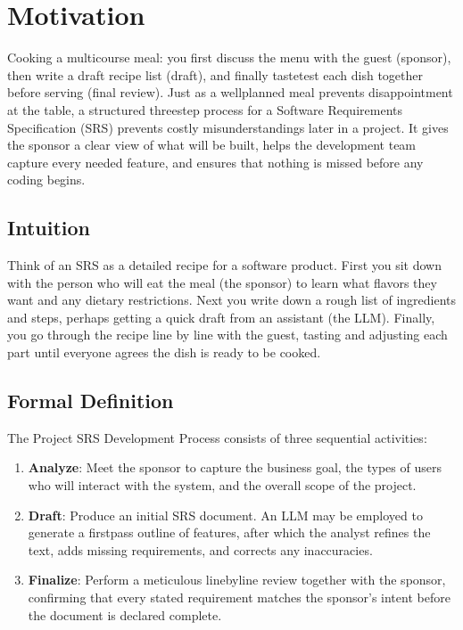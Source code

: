\documentclass[12pt, a4paper]{article}
\begin{document}
\section{Motivation}
Cooking a multicourse meal: you first discuss the menu with the guest (sponsor), then write a draft recipe list (draft), and finally tastetest each dish together before serving (final review). Just as a wellplanned meal prevents disappointment at the table, a structured threestep process for a Software Requirements Specification (SRS) prevents costly misunderstandings later in a project. It gives the sponsor a clear view of what will be built, helps the development team capture every needed feature, and ensures that nothing is missed before any coding begins.  

\subsection{Intuition}
Think of an SRS as a detailed recipe for a software product. First you sit down with the person who will eat the meal (the sponsor) to learn what flavors they want and any dietary restrictions. Next you write down a rough list of ingredients and steps, perhaps getting a quick draft from an assistant (the LLM). Finally, you go through the recipe line by line with the guest, tasting and adjusting each part until everyone agrees the dish is ready to be cooked.  

\subsection{Formal Definition}
The Project SRS Development Process consists of three sequential activities:

\begin{enumerate}
    \item \textbf{Analyze}: Meet the sponsor to capture the business goal, the types of users who will interact with the system, and the overall scope of the project.
    \item \textbf{Draft}: Produce an initial SRS document. An LLM may be employed to generate a firstpass outline of features, after which the analyst refines the text, adds missing requirements, and corrects any inaccuracies.
    \item \textbf{Finalize}: Perform a meticulous linebyline review together with the sponsor, confirming that every stated requirement matches the sponsor's intent before the document is declared complete.
\end{enumerate}
\end{document}
